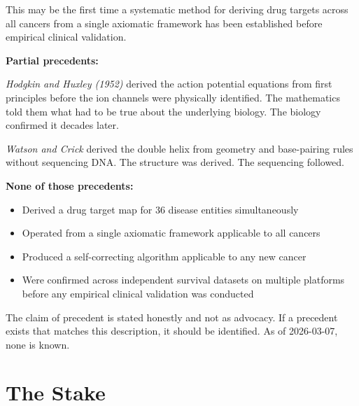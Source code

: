 \documentclass[11pt, a4paper]{article}
\begin{document}
\begin{mdframed}[backgroundcolor=precedentbox,
                 linecolor=purple!30!black,
                 linewidth=1pt]
This may be the first time a systematic method for deriving
drug targets across all cancers from a single axiomatic
framework has been established before empirical clinical
validation.

\medskip
\textbf{Partial precedents:}

\textit{Hodgkin and Huxley (1952)} derived the action
potential equations from first principles before the ion
channels were physically identified. The mathematics told
them what had to be true about the underlying biology.
The biology confirmed it decades later.

\textit{Watson and Crick} derived the double helix from
geometry and base-pairing rules without sequencing DNA.
The structure was derived. The sequencing followed.

\medskip
\textbf{None of those precedents:}
\begin{itemize}[noitemsep]
    \item Derived a drug target map for 36 disease entities
    simultaneously
    \item Operated from a single axiomatic framework
    applicable to all cancers
    \item Produced a self-correcting algorithm applicable
    to any new cancer
    \item Were confirmed across independent survival
    datasets on multiple platforms before any empirical
    clinical validation was conducted
\end{itemize}

The claim of precedent is stated honestly and not as
advocacy. If a precedent exists that matches this
description, it should be identified. As of 2026-03-07,
none is known.
\end{mdframed}

\section{The Stake}
\end{document}
